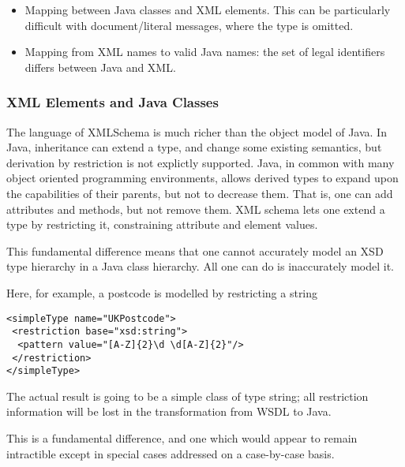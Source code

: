 \begin{itemize}

\item Mapping between Java classes and XML elements. This can be
particularly difficult with document/literal messages, where the type
is omitted.

\item Mapping from XML names to valid Java names: the set of legal
identifiers differs between Java and XML.

\end{itemize}

\subsubsection{XML Elements and Java Classes}
\label{objections:o-x:xml-classes}

The language of XMLSchema is much richer than the object model of
Java. In Java, inheritance can extend a type, and change some existing
semantics, but derivation by restriction is not explictly
supported. Java, in common with many object oriented programming
environments, allows derived types to expand upon the capabilities of
their parents, but not to decrease them. That is, one can add attributes and
methods, but not remove them. XML schema lets one extend a type by 
restricting it, constraining attribute and element values.

This fundamental difference means that one cannot accurately model an
XSD type hierarchy in a Java class hierarchy. All one can do is inaccurately
model it. 

Here, for example, a postcode is modelled by restricting a string



\begin{verbatim}
<simpleType name="UKPostcode">
 <restriction base="xsd:string">
  <pattern value="[A-Z]{2}\d \d[A-Z]{2}"/>
 </restriction>
</simpleType>
\end{verbatim}

The actual result is going to be a simple class of type string; all restriction information
will be lost in the transformation from WSDL to Java. 

This is a fundamental difference, and one which would appear to remain
intractible except in special cases addressed on a case-by-case
basis.

